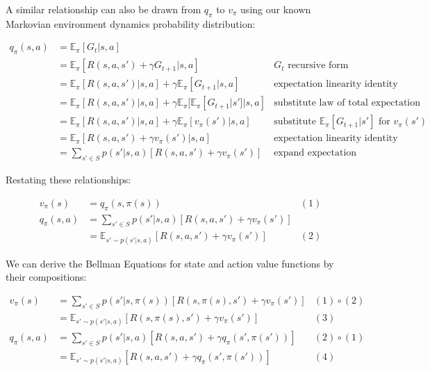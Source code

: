 \documentclass{article}
\begin{document}
A similar relationship can also be drawn from $q_{\pi}$ to $v_{\pi}$ using our known Markovian environment dynamics probability distribution:

\vspace{-5mm}\begin{center}
    \begin{align*}
        q_{\pi}(s,a) &= \mathbb{E}_{\pi}[G_t|s,a] & \\
        &= \mathbb{E}_{\pi}[R(s,a,s')+\gamma G_{t+1}|s, a] & \text{$G_t$ recursive form} \\
        &= \mathbb{E}_{\pi}[R(s,a,s')|s,a] + \gamma\mathbb{E}_{\pi}[G_{t+1}|s,a] & \text{expectation linearity identity} \\
        &= \mathbb{E}_{\pi}[R(s,a,s')|s,a] + \gamma\mathbb{E}_{\pi}[\mathbb{E}_{\pi}[G_{t+1}|s']|s,a] & \text{substitute law of total expectation} \\
        &= \mathbb{E}_{\pi}[R(s,a,s')|s,a] + \gamma\mathbb{E}_{\pi}[v_{\pi}(s')|s,a] & \text{substitute $\mathbb{E}_{\pi}[G_{t+1}|s']$ for $v_{\pi}(s')$} \\
        &= \mathbb{E}_{\pi}[R(s,a,s')+\gamma v_{\pi}(s')|s,a] & \text{expectation linearity identity} \\
        &= \sum_{s'\in S}p(s'|s,a)[R(s,a,s')+\gamma v_{\pi}(s')] & \text{expand expectation}
    \end{align*}
\end{center}

Restating these relationships:
\vspace{-5mm}\begin{center}
    \begin{align*}
        v_{\pi}(s) &= q_{\pi}(s,\pi(s)) & (1) \\
        q_{\pi}(s,a) &= \sum_{s'\in S}p(s'|s,a)[R(s,a,s')+\gamma v_{\pi}(s')] & \\
        &= \mathbb{E}_{s'\sim p(s'|s,a)}[R(s,a,s')+\gamma v_{\pi}(s')] &  (2)
    \end{align*}
\end{center}

We can derive the Bellman Equations for state and action value functions by their compositions:
\vspace{-5mm}\begin{center}
    \begin{align*}
        v_{\pi}(s) &= \sum_{s'\in S}p(s'|s,\pi(s))[R(s,\pi(s),s')+\gamma v_{\pi}(s')] & (1) \circ (2)\\
        &= \mathbb{E}_{s'\sim p(s'|s,a)}[R(s,\pi(s),s')+\gamma v_{\pi}(s')] & (3)\\
        q_{\pi}(s,a) &= \sum_{s'\in S}p(s'|s,a)[R(s,a,s')+\gamma q_{\pi}(s',\pi(s'))] & (2) \circ (1)\\
        &= \mathbb{E}_{s'\sim p(s'|s,a)}[R(s,a,s')+\gamma q_{\pi}(s',\pi(s'))] & (4)
    \end{align*}
\end{center}
\end{document}
